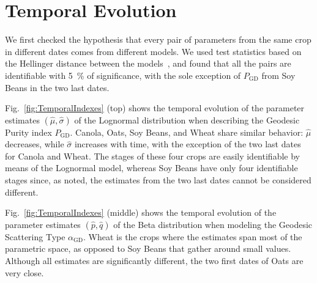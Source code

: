 \documentclass[journal]{IEEEtran}
\begin{document}
	\section{Temporal Evolution}
	
	We first checked the hypothesis that every pair of parameters from the same crop in different dates comes from different models.
	We used test statistics based on the Hellinger distance between the models~\cite{AnalyticExpressionsStochasticDistancesBetweenRelaxedComplexWishartDistributions}, and found that all the pairs are identifiable with \SI{5}{\percent} of significance, with the sole exception of $P_{\text{GD}}$ from Soy Beans in the two last dates.
	
	Fig.~\ref{fig:TemporalIndexes} (top) shows the temporal evolution of the parameter estimates $(\widehat\mu,\widehat\sigma)$ of the Lognormal distribution when describing the Geodesic Purity index $P_{\text{GD}}$.
	Canola, Oats, Soy Beans, and Wheat share similar behavior: $\widehat\mu$ decreases, while $\widehat\sigma$ increases with time, with the exception of the two last dates for Canola and Wheat.
	The stages of these four crops are easily identifiable by means of the Lognormal model, whereas Soy Beans have only four identifiable stages since, as noted, the estimates from the two last dates cannot be considered different.
	
	Fig.~\ref{fig:TemporalIndexes} (middle) shows the temporal evolution of the parameter estimates $(\widehat p, \widehat q)$ of the Beta distribution when modeling the Geodesic Scattering Type $\alpha_{\text{GD}}$.
	Wheat is the crops where the estimates span most of the parametric space, as opposed to Soy Beans that gather around small values.
	Although all estimates are significantly different, the two first dates of Oats are very close.
	
\end{document}
